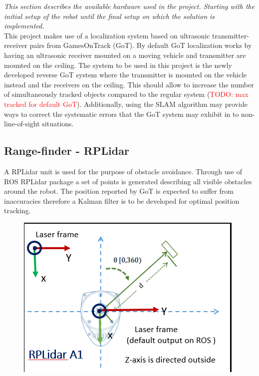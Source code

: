 \label{section:hardware}
\textit{This section describes the available hardware used in the project. Starting with the initial setup of the robot until the final setup on which the solution is implemented.}\\

This project makes use of a localization system based on ultrasonic transmitter-receiver pairs from GamesOnTrack (GoT). By default GoT localization works by having an ultrasonic receiver mounted on a moving vehicle and transmitter are mounted on the ceiling. The system to be used in this project is the newly developed reverse GoT system where the transmitter is mounted on the vehicle instead and the receivers on the ceiling. This should allow to increase the number of simultaneously tracked objects compared to the regular system (\textcolor{red}{TODO: max tracked for default GoT}).
Additionally, using the SLAM algorithm may provide ways to correct the systematic errors that the GoT system may exhibit in to non-line-of-sight situations.\\


\subsection{Range-finder - RPLidar}
A RPLidar unit is used for the purpose of obstacle avoidance. Through use of ROS RPLidar package a set of points is generated describing all visible obstacles around the robot. The position reported by GoT is expected to suffer from inaccuracies therefore a Kalman filter is to be developed for optimal position tracking.

\begin{figure}[H]
\includegraphics[scale=0.75]{Figures/rplidar_A1.png}
\centering
\end{figure}

